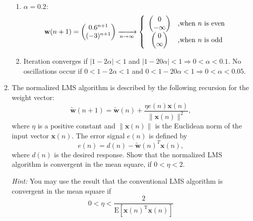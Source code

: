\begin{enumerate}
\begin{solution}
\begin{enumerate}
    \item $\alpha = 0.2$: 
      \begin{equation*}
        {\bf{w}}(n+1) = \begin{pmatrix} 0.6^{n+1} \\
          (-3)^{n+1} \end{pmatrix} \xrightarrow[n\rightarrow\infty]{}\left\{\begin{array}{cl}\begin{pmatrix}0\\-\infty\end{pmatrix} & \mbox{,when } n\mbox{ is even}\\
            \begin{pmatrix}0\\\infty\end{pmatrix} & \mbox{,when } n\mbox{ is odd}\end{array}\right.
      \end{equation*}

    \item Iteration converges if $| 1 - 2 \alpha | < 1$ and $| 1 - 20 \alpha | < 1 \Rightarrow 0 < \alpha < 0.1$. 
      No oscillations occur if $0 < 1 - 2 \alpha < 1$ and $0 < 1 - 20 \alpha < 1 \Rightarrow 0 < \alpha < 0.05$.

    \end{enumerate}

  \end{solution}

\item The normalized LMS algorithm is described by the following
  recursion for the weight vector:
  \begin{equation*}
    \tilde{\mathbf{w}}(n+1)= \tilde{\mathbf{w}}(n) +\frac{\eta e(n)
      \mathbf{x}(n)} {\| \mathbf{x}(n) \|^2},
  \end{equation*}
  where $\eta$ is a positive constant and $\|\mathbf{x}(n) \|$ is the
  Euclidean norm of the input vector $\mathbf{x}(n)$. The error
  signal $e(n)$ is defined by
  \begin{equation*}
    e(n)=d(n)-{\tilde{\mathbf{w}}(n)}^T \mathbf{x}(n),
  \end{equation*}
  where $d(n)$ is the desired response. Show that the normalized LMS
  algorithm is convergent in the mean square, if $0< \eta <2$.

  \emph{Hint:} You may use the result that the conventional LMS
  algorithm is convergent in the mean square if
  \begin{equation}
    0 < \eta < \frac{2}{
      \mathrm{E}\left[\mathbf{x}(n)^{\mathrm{T}}\mathbf{x}(n)\right]
    }
    \label{eq:LMS_convergence}
  \end{equation}


\end{enumerate}
